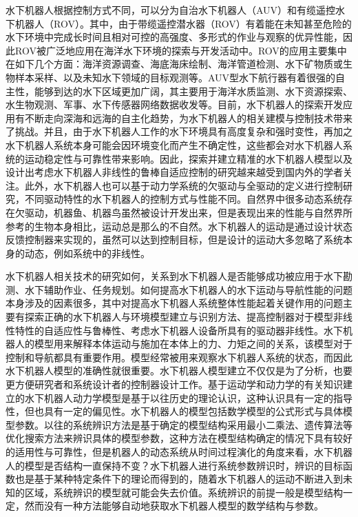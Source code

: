 水下机器人根据控制方式不同，可以分为自治水下机器人（AUV）和有缆遥控水下机器人（ROV）。其中，由于带缆遥控潜水器（ROV）有着能在未知甚至危险的水下环境中完成长时间且相对可控的高强度、多形式的作业与观察的优异性能，因此ROV被广泛地应用在海洋水下环境的探索与开发活动中。ROV的应用主要集中在如下几个方面：海洋资源调查、海底海床绘制、海洋管道检测、水下矿物质或生物样本采样、以及未知水下领域的目标观测等\cite{follestad2017autonomous,aguiar2007dynamic}。AUV型水下航行器有着很强的自主性，能够到达的水下区域更加广阔，其主要用于海洋水质监测、水下资源探索、水生物观测、军事、水下传感器网络数据收发等\cite{maalouf2013contribution}。目前，水下机器人的探索开发应用有不断走向深海和远海的自主化趋势，为水下机器人的相关建模与控制技术带来了挑战\cite{wangbiao2016,yangke2014,yangrui2015,aakre2016development}。并且，由于水下机器人工作的水下环境具有高度复杂和强时变性，再加之水下机器人系统本身可能会因环境变化而产生不确定性，这些都会对水下机器人系统的运动稳定性与可靠性带来影响。因此，探索并建立精准的水下机器人模型以及设计出考虑水下机器人非线性的鲁棒自适应控制的研究越来越受到国内外的学者关注\cite{yang2014modeling,haugen2012modeling,knausgaard2013development,eidsvik2015identification,eng2014added}。此外，水下机器人也可以基于动力学系统的欠驱动与全驱动的定义进行控制研究，不同驱动特性的水下机器人的控制方式与性能不同\cite{fantoni2002non,russdrakebook}。自然界中很多动态系统存在欠驱动，机器鱼、机器鸟虽然被设计开发出来，但是表现出来的性能与自然界所参考的生物本身相比，运动总是那么的不自然\cite{russdrakebook}。水下机器人的运动是通过设计状态反馈控制器来实现的，虽然可以达到控制目标，但是设计的运动大多忽略了系统本身的动态，例如系统中的非线性\cite{russdrakebook,galeani2009tutorial}。

水下机器人相关技术的研究如何，关系到水下机器人是否能够成功被应用于水下勘测、水下辅助作业、任务规划\cite{Souza2007Intelligent}。如何提高水下机器人的水下运动与导航性能的问题本身涉及的因素很多，其中对提高水下机器人系统整体性能起着关键作用的问题主要有探索正确的水下机器人与环境模型建立与识别方法、提高控制器对于模型非线性特性的自适应性与鲁棒性、考虑水下机器人设备所具有的驱动器非线性\cite{yang2012observer,sarhadi2016adaptive2}。水下机器人的模型用来解释本体运动与施加在本体上的力、力矩之间的关系，该模型对于控制和导航都具有重要作用\cite{wu2016parametric}。模型经常被用来观察水下机器人系统的状态，而因此水下机器人模型的准确性就很重要。水下机器人模型建立不仅仅是为了分析，也要更方便研究者和系统设计者的控制器设计工作。基于运动学和动力学的有关知识建立的水下机器人动力学模型是基于以往历史的理论认识，这种认识具有一定的指导性，但也具有一定的偏见性\cite{menezes2014symbolic}。水下机器人的模型包括数学模型的公式形式与具体模型参数\cite{schmidt2009distilling}。以往的系统辨识方法是基于确定的模型结构采用最小二乘法、遗传算法等优化搜索方法来辨识具体的模型参数，这种方法在模型结构确定的情况下具有较好的适用性与可靠性，但是机器人的动态系统从时间过程演化的角度来看，水下机器人的模型是否结构一直保持不变\cite{John1978Methods}？水下机器人进行系统参数辨识时，辨识的目标函数也是基于某种特定条件下的理论而得到的，随着水下机器人的运动不断进入到未知的区域，系统辨识的模型就可能会失去价值。系统辨识的前提一般是模型结构一定，然而没有一种方法能够自动地获取水下机器人模型的数学结构与参数\cite{wu2016parametric}。

